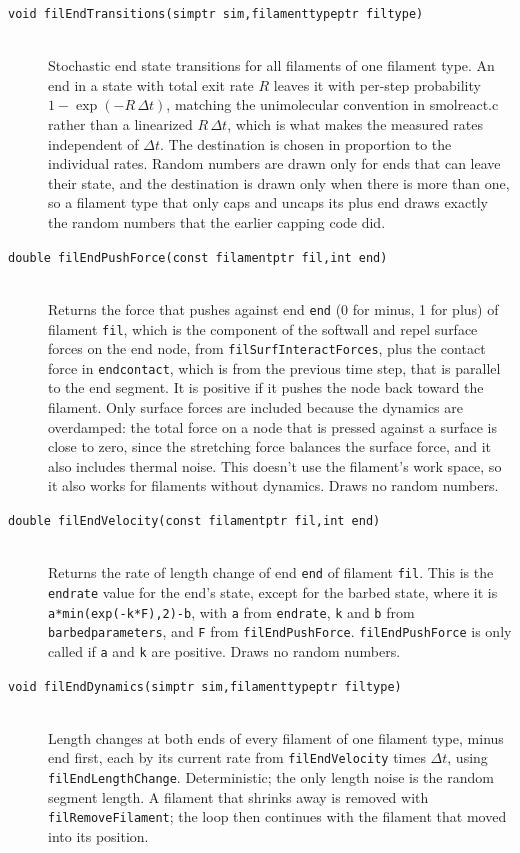 \documentclass {scrbook}
\newcommand {\ttt} {\texttt}
\begin{document}
\begin{description}
\item[\ttt{void filEndTransitions(simptr sim,filamenttypeptr filtype)}] %
\hfill \\
Stochastic end state transitions for all filaments of one filament type. An end in a state with total exit rate $R$ leaves it with per-step probability $1-\exp(-R\,\Delta t)$, matching the unimolecular convention in smolreact.c rather than a linearized $R\,\Delta t$, which is what makes the measured rates independent of $\Delta t$. The destination is chosen in proportion to the individual rates. Random numbers are drawn only for ends that can leave their state, and the destination is drawn only when there is more than one, so a filament type that only caps and uncaps its plus end draws exactly the random numbers that the earlier capping code did.

\item[\ttt{double filEndPushForce(const filamentptr fil,int end)}] %
\hfill \\
Returns the force that pushes against end \ttt{end} (0 for minus, 1 for plus) of filament \ttt{fil}, which is the component of the softwall and repel surface forces on the end node, from \ttt{filSurfInteractForces}, plus the contact force in \ttt{endcontact}, which is from the previous time step, that is parallel to the end segment. It is positive if it pushes the node back toward the filament. Only surface forces are included because the dynamics are overdamped: the total force on a node that is pressed against a surface is close to zero, since the stretching force balances the surface force, and it also includes thermal noise. This doesn't use the filament's work space, so it also works for filaments without dynamics. Draws no random numbers.

\item[\ttt{double filEndVelocity(const filamentptr fil,int end)}] %
\hfill \\
Returns the rate of length change of end \ttt{end} of filament \ttt{fil}. This is the \ttt{endrate} value for the end's state, except for the barbed state, where it is \ttt{a*min(exp(-k*F),2)-b}, with \ttt{a} from \ttt{endrate}, \ttt{k} and \ttt{b} from \ttt{barbedparameters}, and \ttt{F} from \ttt{filEndPushForce}. \ttt{filEndPushForce} is only called if \ttt{a} and \ttt{k} are positive. Draws no random numbers.

\item[\ttt{void filEndDynamics(simptr sim,filamenttypeptr filtype)}] %
\hfill \\
Length changes at both ends of every filament of one filament type, minus end first, each by its current rate from \ttt{filEndVelocity} times $\Delta t$, using \ttt{filEndLengthChange}. Deterministic; the only length noise is the random segment length. A filament that shrinks away is removed with \ttt{filRemoveFilament}; the loop then continues with the filament that moved into its position.


\end{description}
\end{document}
